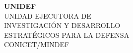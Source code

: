 \begin{minipage}[c][60mm][c]{1.0\linewidth}
\begin{minipage}[c]{0.40\linewidth}
			\end{minipage}
			\hspace*{1pc}
			\begin{minipage}[c]{0.60\linewidth}
				\begin{center}
					\Huge{\textbf{UNIDEF}}\\					
					\Large{UNIDAD EJECUTORA DE\\
					INVESTIGACIÓN Y DESARROLLO\\
					ESTRATÉGICOS PARA LA DEFENSA}\\
					CONICET/MINDEF\\
				\end{center}
			\end{minipage}
	\end{minipage}		

\clearpage
